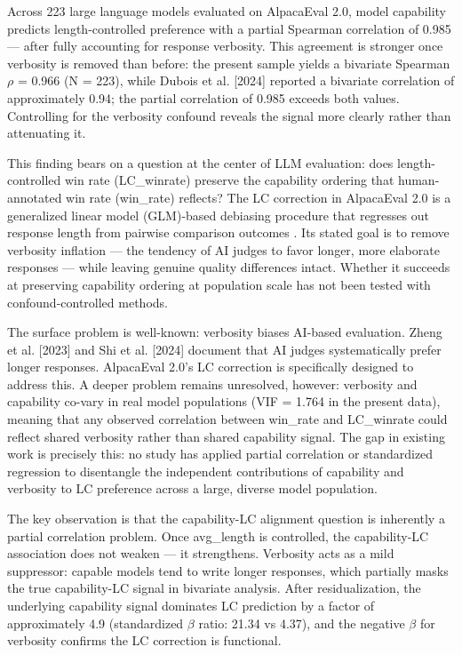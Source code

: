 
Across 223 large language models evaluated on AlpacaEval 2.0, model capability predicts length-controlled preference with a partial Spearman correlation of 0.985 --- after fully accounting for response verbosity. This agreement is stronger once verbosity is removed than before: the present sample yields a bivariate Spearman $\rho$ = 0.966 (N = 223), while Dubois et al. [2024] reported a bivariate correlation of approximately 0.94; the partial correlation of 0.985 exceeds both values. Controlling for the verbosity confound reveals the signal more clearly rather than attenuating it.

This finding bears on a question at the center of LLM evaluation: does length-controlled win rate (LC\_winrate) preserve the capability ordering that human-annotated win rate (win\_rate) reflects? The LC correction in AlpacaEval 2.0 is a generalized linear model (GLM)-based debiasing procedure that regresses out response length from pairwise comparison outcomes \citep{Dubois2024LengthControlled}. Its stated goal is to remove verbosity inflation --- the tendency of AI judges to favor longer, more elaborate responses --- while leaving genuine quality differences intact. Whether it succeeds at preserving capability ordering at population scale has not been tested with confound-controlled methods.

The surface problem is well-known: verbosity biases AI-based evaluation. Zheng et al. [2023] and Shi et al. [2024] document that AI judges systematically prefer longer responses. AlpacaEval 2.0's LC correction is specifically designed to address this. A deeper problem remains unresolved, however: verbosity and capability co-vary in real model populations (VIF = 1.764 in the present data), meaning that any observed correlation between win\_rate and LC\_winrate could reflect shared verbosity rather than shared capability signal. The gap in existing work is precisely this: no study has applied partial correlation or standardized regression to disentangle the independent contributions of capability and verbosity to LC preference across a large, diverse model population.

The key observation is that the capability-LC alignment question is inherently a partial correlation problem. Once avg\_length is controlled, the capability-LC association does not weaken --- it strengthens. Verbosity acts as a mild suppressor: capable models tend to write longer responses, which partially masks the true capability-LC signal in bivariate analysis. After residualization, the underlying capability signal dominates LC prediction by a factor of approximately 4.9 (standardized $\beta$ ratio: 21.34 vs 4.37), and the negative $\beta$ for verbosity confirms the LC correction is functional.

